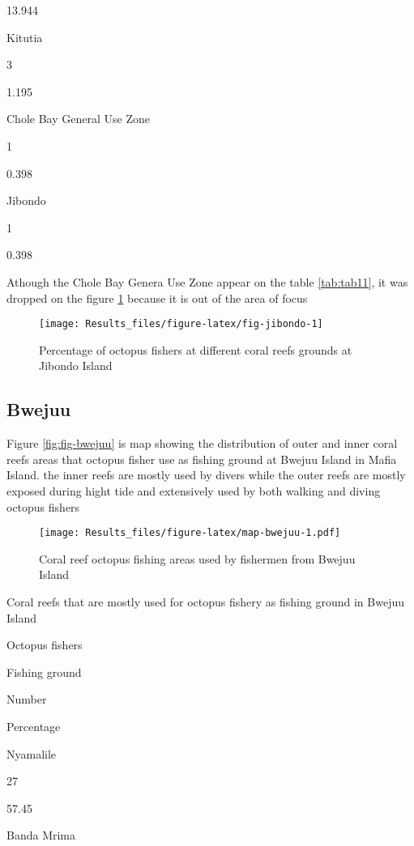 \documentclass[]{article}
\begin{document}
13.944

Kitutia

3

1.195

Chole Bay General Use Zone

1

0.398

Jibondo

1

0.398

Athough the Chole Bay Genera Use Zone appear on the table
\ref{tab:tab11}, it was dropped on the figure \ref{fig:fig-jibondo}
because it is out of the area of focus

\begin{figure}

{\centering \texttt{[image: Results\_files/figure-latex/fig-jibondo-1]} 

}

\caption{Percentage of octopus fishers at different coral reefs grounds at Jibondo Island}\label{fig:fig-jibondo}
\end{figure}

\subsection{Bwejuu}\label{bwejuu}

Figure \ref{fig:fig-bwejuu} is map showing the distribution of outer and
inner coral reefs areas that octopus fisher use as fishing ground at
Bwejuu Island in Mafia Island. the inner reefs are mostly used by divers
while the outer reefs are mostly exposed during hight tide and
extensively used by both walking and diving octopus fishers

\begin{figure}
\centering
\texttt{[image: Results\_files/figure-latex/map-bwejuu-1.pdf]}
\caption{\label{fig:map-bwejuu}Coral reef octopus fishing areas used by
fishermen from Bwejuu Island}
\end{figure}

\label{tab:tab12}Coral reefs that are mostly used for octopus fishery as
fishing ground in Bwejuu Island

Octopus fishers

Fishing ground

Number

Percentage

Nyamalile

27

57.45

Banda Mrima
\end{document}
